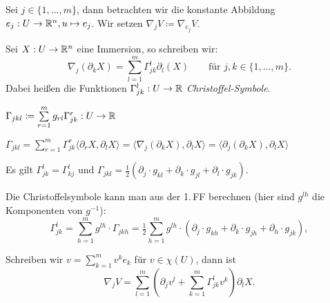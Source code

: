 \documentclass{cheat-sheet}
\begin{document}
\begin{nota}
  Sei $j \in \{1, ..., m\}$, dann betrachten wir die konstante Abbildung $e_j : U \to \mathbb{R}^n, u \mapsto e_j$. Wir setzen $\nabla_j V \coloneqq \nabla_{e_j} V$.
\end{nota}

\begin{defn}
  Sei $X : U \to \mathbb{R}^n$ eine Immersion, so schreiben wir:
  \[ \nabla_j (\partial_k X) = \sum_{l=1}^m \Gamma_{jk}^l \partial_l (X)  \qquad \text{für $j,k \in \{ 1, ..., m \}$.} \]
  Dabei heißen die Funktionen $\Gamma_{jk}^l : U \to \mathbb{R}$ \emph{Christoffel-Symbole}.
\end{defn}

\begin{nota}
  $\Gamma_{jkl} \coloneqq \sum_{r=1}^m g_{rl} \Gamma_{jk}^r : U \to \R$
\end{nota}

\begin{satz}
  $\Gamma_{jkl}\!=\!\sum_{r=1}^m \Gamma_{jk}^{r} \langle \partial_r X, \partial_l X \rangle\!=\!\langle \nabla_j (\partial_k X), \partial_l X \rangle\!=\!\langle \partial_j (\partial_k X), \partial_l X \rangle$
\end{satz}

\begin{satz}
    Es gilt $\Gamma_{jk}^l = \Gamma_{kj}^l \,\, \text{und} \,\, \Gamma_{jkl} = \tfrac{1}{2} (\partial_j \cdot g_{kl} + \partial_k \cdot g_{jl} + \partial_l \cdot g_{jk})$.
\end{satz}

\begin{bem}
  Die Christoffelsymbole kann man aus der 1.\,FF berechnen (hier sind $g^{lh}$ die Komponenten von $g^{-1}$):
  \[
    \Gamma_{jk}^l = \sum_{h=1}^m g^{lh} \cdot \Gamma_{jkh} 
    = \tfrac{1}{2} \sum_{h=1}^m g^{lh} \cdot (\partial_j \cdot g_{kh} + \partial_k \cdot g_{jh} + \partial_h \cdot g_{jk}),
  \]
\end{bem}

\begin{bem}
  Schreiben wir $v = \sum_{k=1}^m v^k e_k$ für $v \in \chi(U)$, dann ist
  \[ \nabla_j V = \sum_{l=1}^m \left( \partial_j v^l + \sum_{k=1}^m \Gamma_{jk}^l v^k \right) \partial_l X. \]
\end{bem}


\end{document}
